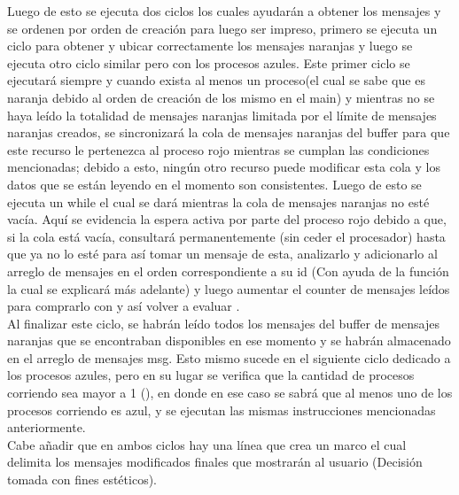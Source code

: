 \documentclass[a4paper]{article}
\begin{document}
    Luego de esto se ejecuta dos ciclos los cuales ayudar\'an a obtener los mensajes y se ordenen por orden de creaci\'on para luego ser impreso, primero se ejecuta un ciclo para obtener y ubicar correctamente los mensajes naranjas y luego se ejecuta otro ciclo similar pero con los procesos azules.
    Este primer ciclo se ejecutar\'a siempre y cuando exista al menos un proceso(el cual se sabe que es naranja debido al orden de creaci\'on de los mismo en el main) y mientras no se haya le\'ido la totalidad de mensajes naranjas limitada por el l\'imite de mensajes naranjas creados, se sincronizar\'a la cola de mensajes naranjas del buffer para que este recurso le pertenezca al proceso rojo mientras se cumplan las condiciones mencionadas; debido a esto, ning\'un otro recurso puede modificar esta cola y los datos que se est\'an leyendo en el momento son consistentes.
    Luego de esto se ejecuta un while el cual se dar\'a mientras la cola de mensajes naranjas no est\'e vac\'ia.
    Aqu\'i se evidencia la espera activa por parte del proceso rojo debido a que, si la cola est\'a vac\'ia, consultar\'a permanentemente (sin ceder el procesador) hasta que ya no lo est\'e para as\'i tomar un mensaje de esta, analizarlo y adicionarlo al arreglo de mensajes  en el orden correspondiente a su id (Con ayuda de la funci\'on  la cual se explicar\'a m\'as adelante) y luego aumentar el counter de mensajes le\'idos para comprarlo con  y as\'i volver a evaluar .\\
    Al finalizar este ciclo, se habr\'an le\'ido todos los mensajes del buffer de mensajes naranjas que se encontraban disponibles en ese momento y se habr\'an almacenado en el arreglo de mensajes msg.
    Esto mismo sucede en el siguiente ciclo dedicado a los procesos azules, pero en su lugar se verifica que la cantidad de procesos corriendo sea mayor a 1 (), en donde en ese caso se sabr\'a que al menos uno de los procesos corriendo es azul, y se ejecutan las mismas instrucciones mencionadas anteriormente.\\
    Cabe a\~nadir que en ambos ciclos hay una l\'inea que crea un marco el cual delimita los mensajes modificados finales que mostrar\'an al usuario (Decisi\'on tomada con fines est\'eticos).\\
\end{document}
